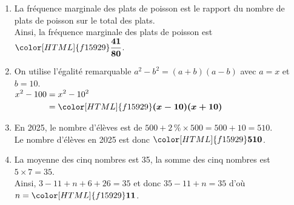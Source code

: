 \documentclass[a4paper,11pt,landscape,exos]{nsi} %
\begin{document}
\begin{multicols}{2}
\begin{enumerate}[]
\item La fréquence marginale des plats de poisson est le rapport du nombre de plats de poisson sur le total des plats.\\
        Ainsi, la fréquence marginale des plats de poisson est ${\color[HTML]{f15929}\boldsymbol{\dfrac{41}{80}}}$.

\item On utilise l'égalité remarquable $a^2-b^2=(a+b)(a-b)$ avec $a=x$ et $b=10$.\\
      $\begin{aligned}x^2-100&=x^2-10^2\\
      &={\color[HTML]{f15929}\boldsymbol{(x-10)(x+10)}}\end{aligned}$

\item En 2025, le nombre d'élèves est de $500+2\,\% \times 500=500+10=510$.\\
      Le nombre d'élèves en 2025 est donc ${\color[HTML]{f15929}\boldsymbol{510}}$.

\item La moyenne des cinq nombres est 35, la somme des cinq nombres est $5\times 7=35$.\\
      Ainsi, $3-11+n+6+26=35$ et donc $35-11+n=35$ d'où $n=\color[HTML]{f15929}\boldsymbol{11}$.
\vfill\null
\columnbreak
\end{enumerate}
$\quad$\\
\end{multicols}
\end{document}
